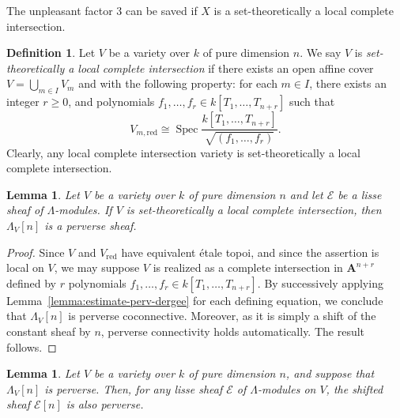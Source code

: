 \documentclass[english]{smfart}
\renewcommand{\mathbb}{\mathbf}
\renewcommand{\geq}{\geqslant}
\theoremstyle{remark}
\theoremstyle{plain}
\newtheorem{lemma}[remark]{Lemma}
\theoremstyle{definition}
\newtheorem{definition}[remark]{Definition}
\numberwithin{equation}{remark}
\theoremstyle{void}
\begin{document}
The unpleasant factor \(3\) can be saved if \(X\) is a set-theoretically
a local complete intersection.

\begin{definition}
Let \(V\) be a variety over \(k\) of pure dimension \(n\).  We say
\(V\) is \emph{set-theoretically a local complete intersection} if
there exists an open affine cover \(V = \bigcup_{m\in I} V_{m}\) and
with the following property: for each \(m \in I\), there exists an integer \(r\geq 0\), and polynomials \(f_{1},\ldots, f_{r} \in k[T_{1},\ldots,T_{n+r}]\) such that
\[
V_{m,\mathrm{red}} \cong \operatorname{Spec}\frac{k[T_1,\ldots,T_{n+r}]}{\sqrt{(f_{1},\ldots,f_{r})}}.
\]
Clearly, any local complete intersection variety is set-theoretically a local complete intersection.
\end{definition}

\begin{lemma}\label{lemma:lci-perv}
Let \(V\) be a variety over \(k\) of pure dimension \(n\)
and let \(\mathcal{E}\) be a lisse sheaf of \(\Lambda\)-modules.
If \(V\) is set-theoretically a local complete intersection,
then \(\Lambda_V[n]\) is a perverse sheaf.
\end{lemma}

\begin{proof}
Since \(V\) and \(V_{\mathrm{red}}\) have equivalent étale topoi,
and since the assertion is local on \(V\), we may suppose \(V\) is realized
as a complete intersection in \(\mathbb{A}^{n+r}\) defined by \(r\)
polynomials \(f_1, \ldots, f_r \in k[T_1, \ldots, T_{n+r}]\).  By
successively applying Lemma~\ref{lemma:estimate-perv-dergee} for each
defining equation, we conclude that \(\Lambda_V[n]\) is perverse
coconnective.  Moreover, as it is simply a shift of the constant sheaf
by \(n\), perverse connectivity holds automatically. The result
follows.
\end{proof}


\begin{lemma}\label{lemma:const-vs-local-const-perv}
Let \(V\) be a variety over \(k\) of pure dimension \(n\), and suppose
that \(\Lambda_V[n]\) is perverse.  Then, for any lisse sheaf
\(\mathcal{E}\) of \(\Lambda\)-modules on \(V\), the shifted sheaf
\(\mathcal{E}[n]\) is also perverse.
\end{lemma}
\end{document}
